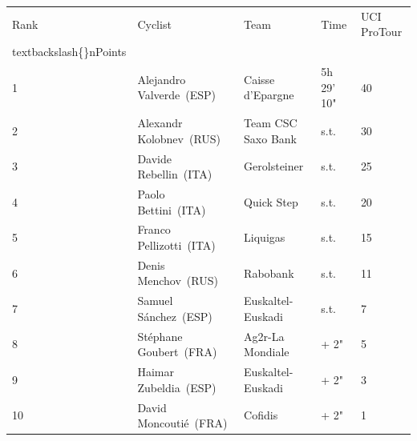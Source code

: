 \documentclass{article}
\begin{document}
\begin{tabular}{lllll}
\toprule
Rank & Cyclist & Team & Time & UCI ProTour\\textbackslash\{\}nPoints \\
\midrule
1 & Alejandro Valverde (ESP) & Caisse d'Epargne & 5h 29' 10" & 40 \\
2 & Alexandr Kolobnev (RUS) & Team CSC Saxo Bank & s.t. & 30 \\
3 & Davide Rebellin (ITA) & Gerolsteiner & s.t. & 25 \\
4 & Paolo Bettini (ITA) & Quick Step & s.t. & 20 \\
5 & Franco Pellizotti (ITA) & Liquigas & s.t. & 15 \\
6 & Denis Menchov (RUS) & Rabobank & s.t. & 11 \\
7 & Samuel Sánchez (ESP) & Euskaltel-Euskadi & s.t. & 7 \\
8 & Stéphane Goubert (FRA) & Ag2r-La Mondiale & + 2" & 5 \\
9 & Haimar Zubeldia (ESP) & Euskaltel-Euskadi & + 2" & 3 \\
10 & David Moncoutié (FRA) & Cofidis & + 2" & 1 \\
\bottomrule
\end{tabular}
\end{document}

